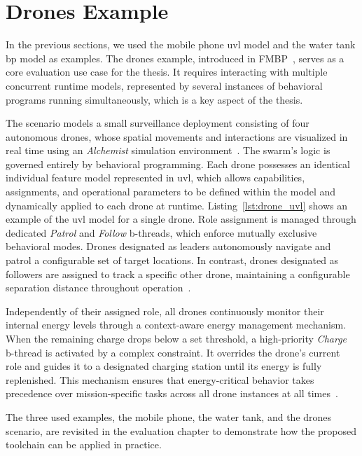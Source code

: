 \section{Drones Example}
\label{sec:bg_drones_example}

In the previous sections, we used the mobile phone \gls{uvl} model and the water tank \gls{bp} model as examples.
The drones example, introduced in FMBP~\cite{felber_comprehensible_2025}, serves as a core evaluation use case for the thesis.
It requires interacting with multiple concurrent runtime models, represented by several instances of behavioral programs running simultaneously, which is a key aspect of the thesis.



The scenario models a small surveillance deployment consisting of four autonomous drones, whose spatial movements and interactions are visualized in real time using an \textit{Alchemist} simulation environment~\cite{pianini_chemical-oriented_2013}.
The swarm's logic is governed entirely by behavioral programming.
Each drone possesses an identical individual feature model represented in \gls{uvl}, which allows capabilities, assignments, and operational parameters to be defined within the model and dynamically applied to each drone at runtime.
Listing~\ref{lst:drone_uvl} shows an example of the \gls{uvl} model for a single drone.
Role assignment is managed through dedicated \textit{Patrol} and \textit{Follow} b-threads, which enforce mutually exclusive behavioral modes.
Drones designated as leaders autonomously navigate and patrol a configurable set of target locations.
In contrast, drones designated as followers are assigned to track a specific other drone, maintaining a configurable separation distance throughout operation~\cite{felber_comprehensible_2025}.

Independently of their assigned role, all drones continuously monitor their internal energy levels through a context-aware energy management mechanism.
When the remaining charge drops below a set threshold, a high-priority 	\textit{Charge} b-thread is activated by a complex constraint.
It overrides the drone's current role and guides it to a designated charging station until its energy is fully replenished.
This mechanism ensures that energy-critical behavior takes precedence over mission-specific tasks across all drone instances at all times~\cite{felber_comprehensible_2025}.

The three used examples, the mobile phone, the water tank, and the drones scenario, are revisited in the evaluation chapter to demonstrate how the proposed toolchain can be applied in practice.